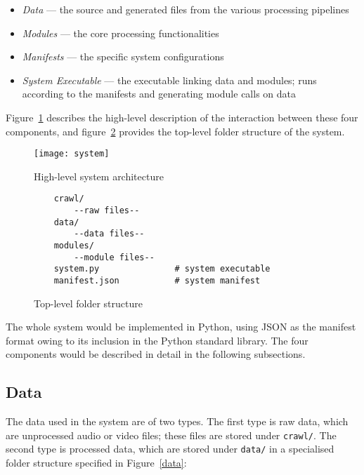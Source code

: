 \begin{itemize}
    \item \textit{Data} --- the source and generated files from the various
    processing pipelines
    \item \textit{Modules} --- the core processing functionalities
    \item \textit{Manifests} --- the specific system configurations
    \item \textit{System Executable} --- the executable linking data and
    modules; runs according to the manifests and generating module calls on
    data
\end{itemize}

Figure~\ref{top-arch} describes the high-level description of the interaction
between these four components, and figure~\ref{top-lvl} provides the top-level
folder structure of the system.

\begin{figure}[ht]
\begin{center}
    \texttt{[image: system]}
    \caption{High-level system architecture}\label{top-arch}
\end{center}
\end{figure}

\begin{figure}[ht]
\begin{lstlisting}
    crawl/
        --raw files--
    data/
        --data files--
    modules/
        --module files--
    system.py               # system executable
    manifest.json           # system manifest
\end{lstlisting}
\caption{Top-level folder structure}\label{top-lvl}
\end{figure}

The whole system would be implemented in Python, using JSON as the manifest
format owing to its inclusion in the Python standard library. The four
components would be described in detail in the following subsections.

\subsection{Data}\label{sec:im:arch:data}

The data used in the system are of two types. The first type is raw data, 
which are unprocessed audio or video files; these files are stored under
\texttt{crawl/}. The second type is processed data, which are stored under
\texttt{data/} in a specialised folder structure specified in Figure~\ref{data}:


